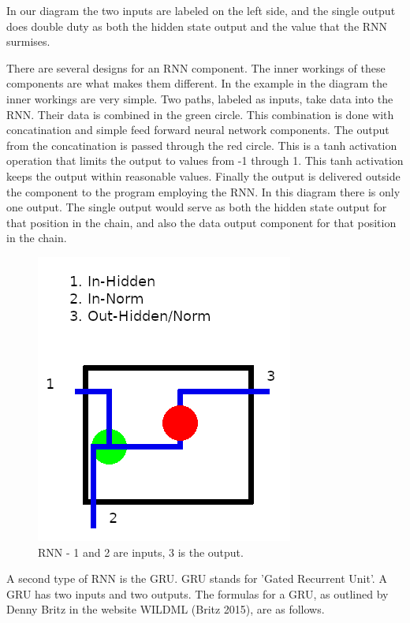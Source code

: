 In our diagram the two inputs are labeled on the left side, and the single output does double duty as both the hidden state output and the value that the RNN surmises.

There are several designs for an RNN component. The inner workings of these components are what makes them different. In the example in the diagram the inner workings are very simple. Two paths, labeled as inputs, take data into the RNN. Their data is combined in the green circle. This combination is done with concatination and simple feed forward neural network components. The output from the concatination is passed through the red circle. This is a tanh activation operation that limits the output to values from -1 through 1. This tanh activation keeps the output within reasonable values. Finally the output is delivered outside the component to the program employing the RNN. In this diagram there is only one output. The single output would serve as both the hidden state output for that position in the chain, and also the data output component for that position in the chain.

\begin{figure}[H]
	
	\includegraphics[scale=1.0]{diagram-rnn}
	
	\caption[Recurrent Neural Network]{RNN - 1 and 2 are inputs, 3 is the output.}
	
\end{figure}

A second type of RNN is the GRU. GRU stands for 'Gated Recurrent Unit'. A GRU has two inputs and two outputs. The formulas for a GRU, as outlined by Denny Britz in the website WILDML (Britz 2015)\cite{2015Britz}, are as follows.


